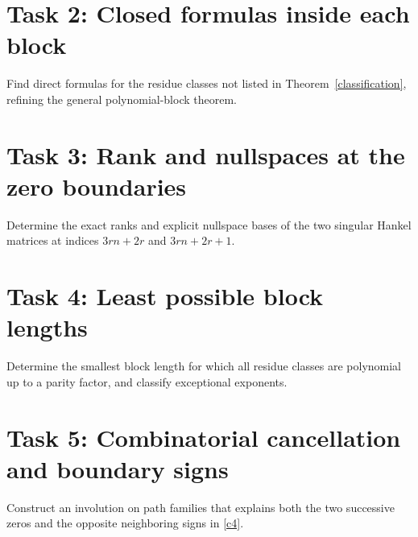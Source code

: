 \documentclass[10pt]{article}
\begin{document}
\section*{Task 2: Closed formulas inside each block}
Find direct formulas for the residue classes not listed in
Theorem~\ref{classification}, refining the general polynomial-block theorem.

\section*{Task 3: Rank and nullspaces at the zero boundaries}
Determine the exact ranks and explicit nullspace bases of the two
singular Hankel matrices at indices $3rn+2r$ and $3rn+2r+1$.

\section*{Task 4: Least possible block lengths}
Determine the smallest block length for which all residue classes
are polynomial up to a parity factor, and classify exceptional exponents.

\section*{Task 5: Combinatorial cancellation and boundary signs}
Construct an involution on path families that explains both the two
successive zeros and the opposite neighboring signs in \eqref{c4}.
\end{document}

